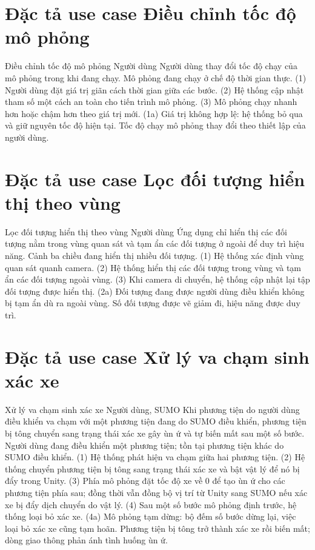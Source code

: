 \documentclass[../DoAn.tex]{subfiles}
\begin{document}
\section{Đặc tả use case Điều chỉnh tốc độ mô phỏng}

\uctable
    {Điều chỉnh tốc độ mô phỏng}
    {Người dùng}
    {Người dùng thay đổi tốc độ chạy của mô phỏng trong khi đang chạy.}
    {Mô phỏng đang chạy ở chế độ thời gian thực.}
    {(1) Người dùng đặt giá trị giãn cách thời gian giữa các bước. (2) Hệ thống cập nhật tham số một cách an toàn cho tiến trình mô phỏng. (3) Mô phỏng chạy nhanh hơn hoặc chậm hơn theo giá trị mới.}
    {(1a) Giá trị không hợp lệ: hệ thống bỏ qua và giữ nguyên tốc độ hiện tại.}
    {Tốc độ chạy mô phỏng thay đổi theo thiết lập của người dùng.}

\section{Đặc tả use case Lọc đối tượng hiển thị theo vùng}

\uctable
    {Lọc đối tượng hiển thị theo vùng}
    {Người dùng}
    {Ứng dụng chỉ hiển thị các đối tượng nằm trong vùng quan sát và tạm ẩn các đối tượng ở ngoài để duy trì hiệu năng.}
    {Cảnh ba chiều đang hiển thị nhiều đối tượng.}
    {(1) Hệ thống xác định vùng quan sát quanh camera. (2) Hệ thống hiển thị các đối tượng trong vùng và tạm ẩn các đối tượng ngoài vùng. (3) Khi camera di chuyển, hệ thống cập nhật lại tập đối tượng được hiển thị.}
    {(2a) Đối tượng đang được người dùng điều khiển không bị tạm ẩn dù ra ngoài vùng.}
    {Số đối tượng được vẽ giảm đi, hiệu năng được duy trì.}

\section{Đặc tả use case Xử lý va chạm sinh xác xe}

\uctable
    {Xử lý va chạm sinh xác xe}
    {Người dùng, SUMO}
    {Khi phương tiện do người dùng điều khiển va chạm với một phương tiện đang do \gls{SUMO} điều khiển, phương tiện bị tông chuyển sang trạng thái xác xe gây ùn ứ và tự biến mất sau một số bước.}
    {Người dùng đang điều khiển một phương tiện; tồn tại phương tiện khác do \gls{SUMO} điều khiển.}
    {(1) Hệ thống phát hiện va chạm giữa hai phương tiện. (2) Hệ thống chuyển phương tiện bị tông sang trạng thái xác xe và bật vật lý để nó bị đẩy trong Unity. (3) Phía mô phỏng đặt tốc độ xe về 0 để tạo ùn ứ cho các phương tiện phía sau; đồng thời vẫn đồng bộ vị trí từ Unity sang SUMO nếu xác xe bị đẩy dịch chuyển do vật lý. (4) Sau một số bước mô phỏng định trước, hệ thống loại bỏ xác xe.}
    {(4a) Mô phỏng tạm dừng: bộ đếm số bước dừng lại, việc loại bỏ xác xe cũng tạm hoãn.}
    {Phương tiện bị tông trở thành xác xe rồi biến mất; dòng giao thông phản ánh tình huống ùn ứ.}
\end{document}
